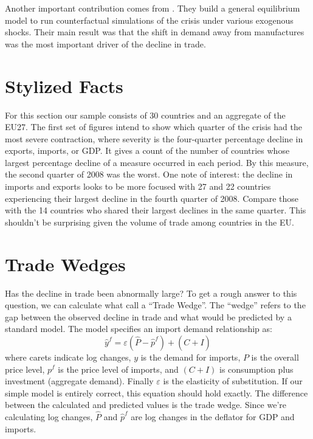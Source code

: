 \documentclass[11pt]{article}
\begin{document}
  Another important contribution comes from \cite{eaton-kortum-neiman-romalis:2011}.  They build a general equilibrium model to run counterfactual simulations of the crisis under various exogenous shocks.  Their main result was that the shift in demand away from manufactures was the most important driver of the decline in trade.

\section{Stylized Facts}
\label{sec:stylized_facts}
For this section our sample consists of 30 countries and an aggregate of the EU27.  The first set of figures intend to show which quarter of the crisis had the most severe contraction, where severity is the four-quarter percentage decline in exports, imports, or GDP.  It gives a count of the number of countries whose largest percentage decline of a measure occurred in each period.  By this measure, the second quarter of 2008 was the worst.  One note of interest: the decline in imports and exports looks to be more focused with 27 and 22 countries experiencing their largest decline in the fourth quarter of 2008.  Compare those with the 14 countries who shared their largest declines in the same quarter.  This shouldn't be surprising given the volume of trade among countries in the EU.

\section{Trade Wedges} %
\label{sec:trade_wedges}
  Has the decline in trade been abnormally large?  To get a rough answer to this question, we can calculate what \cite{llt:2010} call a ``Trade Wedge''.  The ``wedge'' refers to the gap between the observed decline in trade and what would be predicted by a standard model.  The model specifies an import demand relationship as:
  \begin{equation}
      \hat{y}^f = \varepsilon(\hat{P} - \hat{p}^f) + (\hat{C + I})
  \end{equation}
  where carets indicate log changes, $y$ is the demand for imports, $P$ is the overall price level, $p^f$ is the price level of imports, and $(C + I)$ is consumption plus investment (aggregate demand).  Finally $\varepsilon$ is the elasticity of substitution.  If our simple model is entirely correct, this equation should hold exactly.  The difference between the calculated and predicted values is the trade wedge.  Since we're calculating log changes, $\hat{P}$ and $\hat{p}^f$ are log changes in the deflator for GDP and imports.
\end{document}
